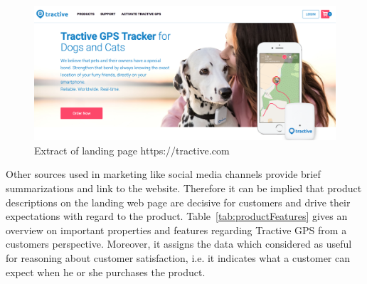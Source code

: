 \begin{figure}
	\centering
	\includegraphics[width=1.0\textwidth]{img/tractiveLanding.png}
	\caption{Extract of landing page https://tractive.com}
	\label{fig:tractiveLanding}
\end{figure} 

Other sources used in marketing like social media channels provide brief summarizations and link to the website. Therefore it can be implied that product descriptions on the landing web page are decisive for customers and drive their expectations with regard to the product. Table~\ref{tab:productFeatures} gives an overview on important properties and features regarding Tractive GPS from a customers perspective. Moreover, it assigns the data which considered as useful for reasoning about customer satisfaction, i.e. it indicates what a customer can expect when he or she purchases the product.

